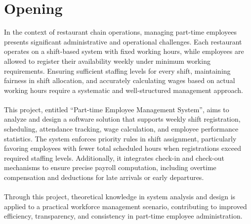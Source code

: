 \chapter*{Opening}
In the context of restaurant chain operations, managing part-time employees presents significant administrative and operational challenges. Each restaurant operates on a shift-based system with fixed working hours, while employees are allowed to register their availability weekly under minimum working requirements. Ensuring sufficient staffing levels for every shift, maintaining fairness in shift allocation, and accurately calculating wages based on actual working hours require a systematic and well-structured management approach.
\\\\
This project, entitled “Part-time Employee Management System”, aims to analyze and design a software solution that supports weekly shift registration, scheduling, attendance tracking, wage calculation, and employee performance statistics. The system enforces priority rules in shift assignment, particularly favoring employees with fewer total scheduled hours when registrations exceed required staffing levels. Additionally, it integrates check-in and check-out mechanisms to ensure precise payroll computation, including overtime compensation and deductions for late arrivals or early departures.
\\\\
Through this project, theoretical knowledge in system analysis and design is applied to a practical workforce management scenario, contributing to improved efficiency, transparency, and consistency in part-time employee administration.
